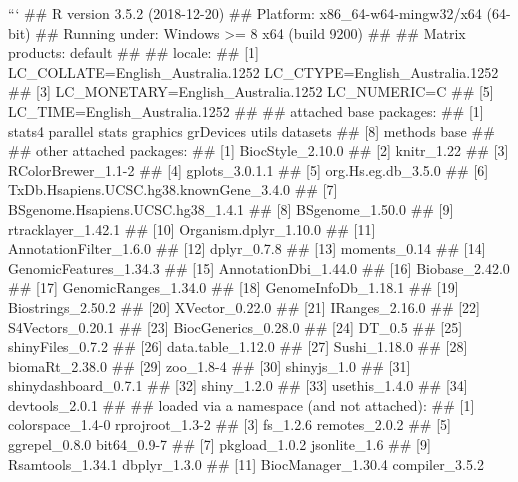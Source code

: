 ```
## R version 3.5.2 (2018-12-20)
## Platform: x86_64-w64-mingw32/x64 (64-bit)
## Running under: Windows >= 8 x64 (build 9200)
## 
## Matrix products: default
## 
## locale:
## [1] LC_COLLATE=English_Australia.1252  LC_CTYPE=English_Australia.1252   
## [3] LC_MONETARY=English_Australia.1252 LC_NUMERIC=C                      
## [5] LC_TIME=English_Australia.1252    
## 
## attached base packages:
## [1] stats4    parallel  stats     graphics  grDevices utils     datasets 
## [8] methods   base     
## 
## other attached packages:
##  [1] BiocStyle_2.10.0                       
##  [2] knitr_1.22                             
##  [3] RColorBrewer_1.1-2                     
##  [4] gplots_3.0.1.1                         
##  [5] org.Hs.eg.db_3.5.0                     
##  [6] TxDb.Hsapiens.UCSC.hg38.knownGene_3.4.0
##  [7] BSgenome.Hsapiens.UCSC.hg38_1.4.1      
##  [8] BSgenome_1.50.0                        
##  [9] rtracklayer_1.42.1                     
## [10] Organism.dplyr_1.10.0                  
## [11] AnnotationFilter_1.6.0                 
## [12] dplyr_0.7.8                            
## [13] moments_0.14                           
## [14] GenomicFeatures_1.34.3                 
## [15] AnnotationDbi_1.44.0                   
## [16] Biobase_2.42.0                         
## [17] GenomicRanges_1.34.0                   
## [18] GenomeInfoDb_1.18.1                    
## [19] Biostrings_2.50.2                      
## [20] XVector_0.22.0                         
## [21] IRanges_2.16.0                         
## [22] S4Vectors_0.20.1                       
## [23] BiocGenerics_0.28.0                    
## [24] DT_0.5                                 
## [25] shinyFiles_0.7.2                       
## [26] data.table_1.12.0                      
## [27] Sushi_1.18.0                           
## [28] biomaRt_2.38.0                         
## [29] zoo_1.8-4                              
## [30] shinyjs_1.0                            
## [31] shinydashboard_0.7.1                   
## [32] shiny_1.2.0                            
## [33] usethis_1.4.0                          
## [34] devtools_2.0.1                         
## 
## loaded via a namespace (and not attached):
##  [1] colorspace_1.4-0            rprojroot_1.3-2            
##  [3] fs_1.2.6                    remotes_2.0.2              
##  [5] ggrepel_0.8.0               bit64_0.9-7                
##  [7] pkgload_1.0.2               jsonlite_1.6               
##  [9] Rsamtools_1.34.1            dbplyr_1.3.0               
## [11] BiocManager_1.30.4          compiler_3.5.2             
